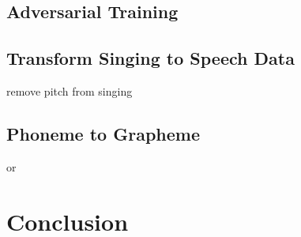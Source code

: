 \documentclass[letterpaper, 12pt]{article}
\begin{document}
\begin{multicols*}{2}
\subsection{Adversarial Training}
\subsection{Transform Singing to Speech Data}
remove pitch from singing
\subsection{Phoneme to Grapheme}
\citep{G2P} or \citep{P2G}


\section{Conclusion}
\citep{pyannote}
\printbibliography

\end{multicols*}
\end{document}
